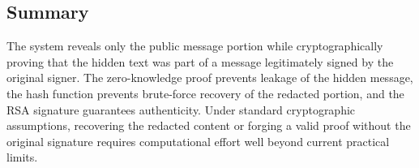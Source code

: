 \documentclass[]{article}
\begin{document}
\subsection{Summary}

The system reveals only the public message portion while cryptographically proving that the hidden text was part of a message legitimately signed by the original signer. The zero-knowledge proof prevents leakage of the hidden message, the hash function prevents brute-force recovery of the redacted portion, and the RSA signature guarantees authenticity. Under standard cryptographic assumptions, recovering the redacted content or forging a valid proof without the original signature requires computational effort well beyond current practical limits.

\newpage


\newpage
\end{document}
